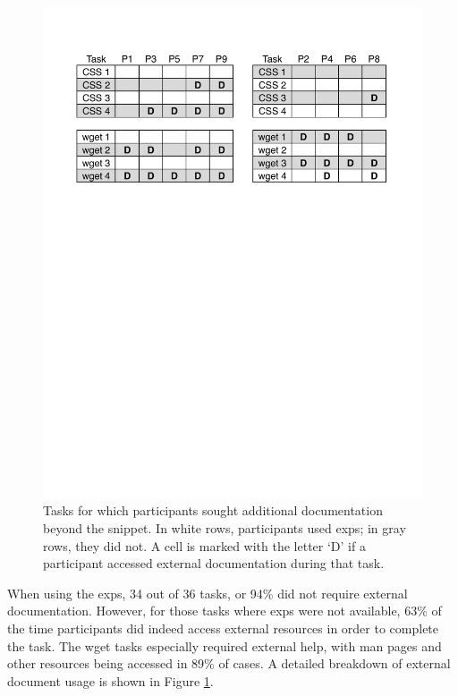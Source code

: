 \begin{figure}
\centering
\includegraphics[width=\columnwidth]{figures/doc_accesses}
\caption{
Tasks for which participants sought additional documentation beyond the snippet. In white rows, participants used \glspl{exp}; in gray rows, they did not.
A cell is marked with the letter `D' if a participant accessed external documentation during that task.
}
\label{fig:doc_accesses}
\end{figure}

When using the \glspl{exp}, 34 out of 36 tasks, or 94\% did not require external documentation.  However, for those tasks where \glspl{exp} were not available, 63\% of the time participants did indeed access external resources in order to complete the task.  The wget tasks especially required external help, with man pages and other resources being accessed in 89\% of cases.  
A detailed breakdown of external document usage is shown in Figure \ref{fig:doc_accesses}. 




